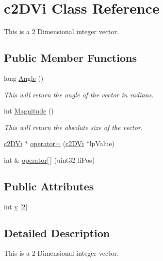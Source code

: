 \hypertarget{classc2_d_vi}{
\section{c2DVi Class Reference}
\label{classc2_d_vi}
}


This is a 2 Dimensional integer vector.  


\subsection*{Public Member Functions}
\begin{DoxyCompactItemize}
\item 
long \hyperlink{classc2_d_vi_ae9dc5cc90d02c23b83db88c3c7067cb6}{Angle} ()
\begin{DoxyCompactList}\small\item\em This will return the angle of the vector in radians. \item\end{DoxyCompactList}\item 
int \hyperlink{classc2_d_vi_a308f02ff176570f09b80fc2894f9a141}{Magnitude} ()
\begin{DoxyCompactList}\small\item\em This will return the absolute size of the vector. \item\end{DoxyCompactList}\item 
\hyperlink{classc2_d_vi}{c2DVi} $\ast$ \hyperlink{classc2_d_vi_a69fb02bd5b992ffa54b2e066734eeaea}{operator=} (\hyperlink{classc2_d_vi}{c2DVi} $\ast$lpValue)
\item 
int \& \hyperlink{classc2_d_vi_a30257e338c34766b01a817e1af92fb78}{operator\mbox{[}$\,$\mbox{]}} (uint32 liPos)
\end{DoxyCompactItemize}
\subsection*{Public Attributes}
\begin{DoxyCompactItemize}
\item 
int \hyperlink{classc2_d_vi_a385ce81f7b5fa22de411eedb24b14f27}{v} \mbox{[}2\mbox{]}
\end{DoxyCompactItemize}


\subsection{Detailed Description}
This is a 2 Dimensional integer vector. 

